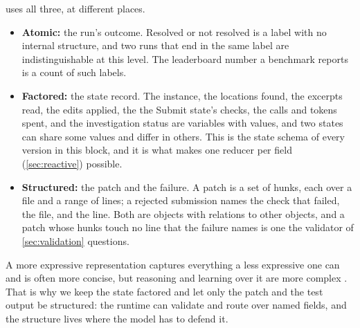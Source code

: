\msa{} uses all three, at different places.
\begin{itemize}
  \item \textbf{Atomic:} the run's outcome. Resolved or not resolved is a label with no
  internal structure, and two runs that end in the same label are indistinguishable at this
  level. The leaderboard number a benchmark reports is a count of such labels.
  \item \textbf{Factored:} the state record. The instance, the locations found, the excerpts
  read, the edits applied, the the Submit state's checks, the calls and tokens spent, and the investigation
  status are variables with values, and two states can share some values and differ in others.
  This is the state schema of every version in this block, and it is what makes one reducer per
  field (\cref{sec:reactive}) possible.
  \item \textbf{Structured:} the patch and the failure. A patch is a set of hunks, each over a
  file and a range of lines; a rejected submission names the check that failed, the file, and the line. Both are objects with relations to other objects, and
  a patch whose hunks touch no line that the failure names is one the validator of
  \cref{sec:validation} questions.
\end{itemize}
A more expressive representation captures everything a less expressive one can and is often
more concise, but reasoning and learning over it are more complex
\citep[\S2.4.7]{russell2020aima}. That is why we keep the state factored and let only the patch
and the test output be structured: the runtime can validate and route over named fields, and
the structure lives where the model has to defend it.

